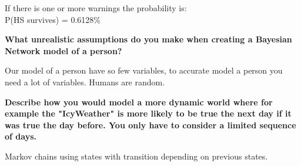 \documentclass[12pt,a4paper]{article}
\begin{document}
If there is one or more warnings the probability is: \\
P(HS survives) = 0.6128\%

\textbf{What unrealistic assumptions do you make when creating a Bayesian Network model of a person?}

Our model of a person have so few variables, to accurate model a person you need a lot of variables. Humans are random.

\textbf{Describe how you would model a more dynamic world where for example the "IcyWeather" is more likely to be true the next day if it was true the day before. You only have to consider a limited sequence of days.}

Markov chains using states with transition depending on previous states.
\end{document}
